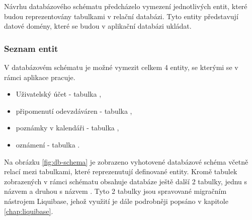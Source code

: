 Návrhu databázového schématu předcházelo vymezení jednotlivých entit, které budou reprezentovány tabulkami v relační databázi. Tyto entity představují datové domény, které se budou v aplikační databázi ukládat.

\subsubsection{Seznam entit}

V databázovém schématu je možné vymezit celkem 4 entity, se kterými se v rámci aplikace pracuje.

\begin{itemize}
    \item Uživatelský účet - tabulka ,
    \item připomenutí odevzdáváren - tabulka ,
    \item poznámky v kalendáři - tabulka ,
    \item oznámení - tabulka .
\end{itemize}

Na obrázku \ref{fig:db-schema} je zobrazeno vyhotovené databázové schéma včetně relací mezi tabulkami, které reprezenutují definované entity. Kromě tabulek zobrazených v rámci schématu obsahuje databáze ještě další 2 tabulky, jednu s názvem  a druhou s názvem . Tyto 2 tabulky jsou spravované migračním nástrojem Liquibase, jehož využití je dále podrobněji popsáno v kapitole \ref{chap:liquibase}.

